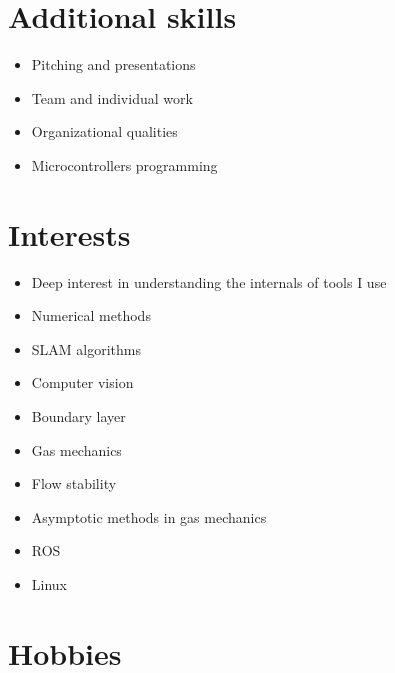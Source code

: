\documentclass[11pt,a4paper,sans]{moderncv}
\begin{document}
\section{Additional skills}
\begin{itemize}
\item Pitching and presentations
\item Team and individual work
\item Organizational qualities
\item Microcontrollers programming
\end{itemize}

\section{Interests}
\begin{itemize}
\item Deep interest in understanding the internals of tools I use
\item Numerical methods
\item SLAM algorithms
\item Computer vision
\item Boundary layer
\item Gas mechanics
\item Flow stability
\item Asymptotic methods in gas mechanics
\item ROS
\item Linux
  \end{itemize}
\section{Hobbies}



\nocite{*}

\end{document}
